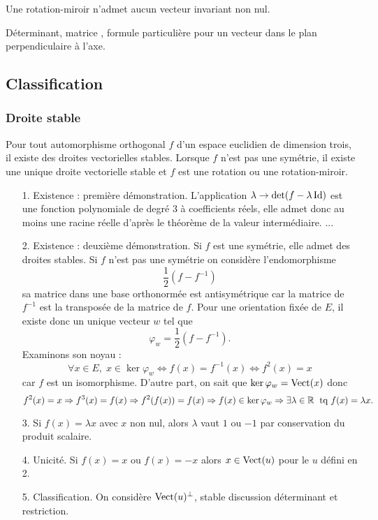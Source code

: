 Une rotation-miroir n'admet aucun vecteur invariant non nul.

Déterminant, matrice , formule particulière pour un vecteur dans le plan perpendiculaire à l'axe.

\subsection{Classification}
\subsubsection{Droite stable}
\begin{propn}
 Pour tout automorphisme orthogonal $f$ d'un espace euclidien de dimension trois, il existe des droites vectorielles stables. Lorsque $f$ n'est pas une symétrie, il existe une unique droite vectorielle stable et $f$ est une rotation ou une rotation-miroir.
\end{propn}
\begin{demo}
 \begin{itemize}
 \item[1. Existence : première démonstration.] L'application $\lambda \rightarrow \det(f-\lambda \mathop{\mathrm{Id}})$ est une fonction polynomiale de degré $3$ à coefficients réels, elle admet donc au moins une racine réelle d'après le théorème de la valeur intermédiaire. ...
\item [2. Existence : deuxième démonstration.]
Si $f$ est une symétrie, elle admet des droites stables.\newline
Si $f$ n'est pas une symétrie on considère l'endomorphisme
\begin{displaymath}
 \frac{1}{2}\left( f - f^{-1}\right) 
\end{displaymath}
sa matrice dans une base orthonormée est antisymétrique car la matrice de $f^{-1}$ est la transposée de la matrice de $f$. Pour une orientation fixée de $E$, il existe donc un unique vecteur $w$ tel que
\begin{displaymath}
 \varphi_w = \frac{1}{2}\left( f - f^{-1}\right) .
\end{displaymath}
Examinons son noyau :
\[
\forall x \in E, \; x \in \ker \varphi_w \Leftrightarrow f(x) = f^{-1}(x) \Leftrightarrow f^2(x) = x
\]
car $f$ est un isomorphisme. D'autre part, on sait que $\ker \varphi_w = \mathop{\mathrm{Vect}}(x)$ donc
\begin{displaymath}
 f^2(x) = x \Rightarrow f^3(x) = f(x) \Rightarrow f^2(f(x)) = f(x) \Rightarrow f(x) \in \ker \varphi_w \Rightarrow \exists \lambda\in \mathbb{R}\;\text{ tq } f(x) = \lambda x.
\end{displaymath}
\item [3.] Si $f(x)=\lambda x$ avec $x$ non nul, alors $\lambda$ vaut $1$ ou $-1$ par conservation du produit scalaire.
\item [4. Unicité.] Si $f(x)=x$ ou $f(x)=-x$ alors $x\in \mathop{\mathrm{Vect}}(u)$ pour le $u$ défini en 2.
\item [5. Classification.] On considère $\mathop{\mathrm{Vect}}(u)^\bot$, stable discussion déterminant et restriction.
\end{itemize}
\end{demo}
